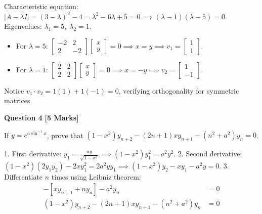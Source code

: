 \begin{solbox}
Characteristic equation: $|A - \lambda I| = (3-\lambda)^2 - 4 = \lambda^2 - 6\lambda + 5 = 0 \implies (\lambda-1)(\lambda-5)=0$.
Eigenvalues: $\lambda_1 = 5, \; \lambda_2 = 1$.
\begin{itemize}
    \item For $\lambda = 5$: $\begin{bmatrix} -2 & 2 \\ 2 & -2 \end{bmatrix}\begin{bmatrix} x \\ y \end{bmatrix} = 0 \implies x = y \implies v_1 = \begin{bmatrix} 1 \\ 1 \end{bmatrix}$.
    \item For $\lambda = 1$: $\begin{bmatrix} 2 & 2 \\ 2 & 2 \end{bmatrix}\begin{bmatrix} x \\ y \end{bmatrix} = 0 \implies x = -y \implies v_2 = \begin{bmatrix} 1 \\ -1 \end{bmatrix}$.
\end{itemize}
\end{solbox}

\begin{examinertip}
Notice $v_1 \cdot v_2 = 1(1) + 1(-1) = 0$, verifying orthogonality for symmetric matrices.
\end{examinertip}

\vspace{4mm}

\noindent\textbf{Question 4} \hfill \textbf{[5 Marks]}

If $y = e^{a \sin^{-1}x}$, prove that $(1-x^2)y_{n+2} - (2n+1)x y_{n+1} - (n^2+a^2)y_n = 0$.

\begin{solbox}
1. First derivative: $y_1 = \frac{a y}{\sqrt{1-x^2}} \implies (1-x^2)y_1^2 = a^2 y^2$.
2. Second derivative: $(1-x^2)(2y_1 y_2) - 2x y_1^2 = 2a^2 y y_1 \implies (1-x^2)y_2 - x y_1 - a^2 y = 0$.
3. Differentiate $n$ times using Leibniz theorem:
\begin{align}
[(1-x^2)y_{n+2} - 2nx y_{n+1} - n(n-1)y_n] - [x y_{n+1} + n y_n] - a^2 y_n &= 0 \\
(1-x^2)y_{n+2} - (2n+1)x y_{n+1} - (n^2+a^2)y_n &= 0
\end{align}
\end{solbox}

